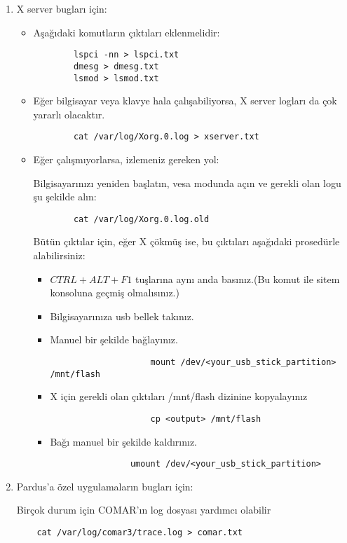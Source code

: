 \documentclass[a4paper,10pt]{article}
\begin{document}
\begin{itemize}
	\begin{enumerate}
	\item X server bugları için:
	\begin{itemize}
		\item Aşağıdaki komutların çıktıları eklenmelidir:
		\begin{verbatim}
		lspci -nn > lspci.txt
		dmesg > dmesg.txt
		lsmod > lsmod.txt
		\end{verbatim}
		\item Eğer bilgisayar veya klavye hala çalışabiliyorsa, X server logları da çok yararlı olacaktır.
		\begin{verbatim}
		cat /var/log/Xorg.0.log > xserver.txt
		\end{verbatim}
		\item Eğer çalışmıyorlarsa, izlemeniz gereken yol:

		Bilgisayarınızı yeniden başlatın, vesa modunda açın ve gerekli olan logu şu şekilde alın:
		\begin{verbatim}
		cat /var/log/Xorg.0.log.old
		\end{verbatim}

		Bütün çıktılar için, eğer X çökmüş ise, bu çıktıları aşağıdaki prosedürle alabilirsiniz:
		\begin{itemize}
			\item $CTRL+ALT+F1$ tuşlarına aynı anda basınız.(Bu komut ile sitem konsoluna geçmiş olmalısınız.)
			\item Bilgisayarınıza usb bellek takınız.
			\item Manuel bir şekilde bağlayınız.
				\begin{verbatim}
    				mount /dev/<your_usb_stick_partition> /mnt/flash
				\end{verbatim}
			\item X için gerekli olan çıktıları /mnt/flash dizinine kopyalayınız
				\begin{verbatim}
     				cp <output> /mnt/flash
				\end{verbatim}
			\item Bağı manuel bir şekilde kaldırınız.
				\begin{verbatim}
  				umount /dev/<your_usb_stick_partition>
				\end{verbatim}
		\end{itemize}
	\end{itemize}
	\item Pardus'a özel uygulamaların bugları için:
	
	Birçok durum için COMAR'ın log dosyası yardımcı olabilir
	\begin{verbatim}
	cat /var/log/comar3/trace.log > comar.txt
	\end{verbatim}


\end{enumerate}
\end{itemize}
\end{document}
